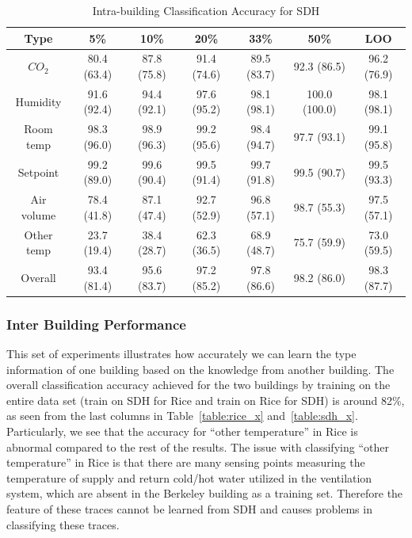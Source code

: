 \begin{table}[ht!]
\centering %
\begin{tabular}{c | c | c | c | c | c | c}%
\hline %
Type & 5\% & 10\% & 20\% & 33\% & 50\% & LOO\\ %
\hline\hline %
$CO_{2}$ & 80.4 (63.4) & 87.8 (75.8) & 91.4 (74.6) & 89.5 (83.7) & 92.3 (86.5) & 96.2 (76.9)\\ \hline
Humidity & 91.6 (92.4) & 94.4 (92.1) & 97.6 (95.2) & 98.1 (98.1) & 100.0 (100.0) & 98.1 (98.1)\\ \hline
Room temp & 98.3 (96.0) & 98.9 (96.3) & 99.2 (95.6) & 98.4 (94.7) & 97.7 (93.1) & 99.1 (95.8)\\ \hline
Setpoint & 99.2 (89.0) & 99.6 (90.4) & 99.5 (91.4) & 99.7 (91.8) & 99.5 (90.7) & 99.5 (93.3)\\ \hline
Air volume & 78.4 (41.8) & 87.1 (47.4) & 92.7 (52.9) & 96.8 (57.1) & 98.7 (55.3) & 97.5 (57.1)\\ \hline
Other temp & 23.7 (19.4) & 38.4 (28.7) & 62.3 (36.5) & 68.9 (48.7) & 75.7 (59.9) & 73.0 (59.5)\\ \hline
Overall & 93.4 (81.4) & 95.6 (83.7) & 97.2 (85.2) & 97.8 (86.6) & 98.2 (86.0) & 98.3 (87.7)\\ \hline
\end{tabular}
\caption{Intra-building Classification Accuracy for SDH}
\label{table:sdh} %
\end{table}

\subsubsection{Inter Building Performance}
This set of experiments illustrates how accurately we can learn the type information of one building based on the knowledge from another building. The overall classification accuracy 
achieved for the two buildings by training on the entire data set (train on SDH for Rice and train on Rice for SDH) is around 82\%, as seen from the last columns in Table~\ref{table:rice_x} 
and~\ref{table:sdh_x}. Particularly, we see that the accuracy for ``other temperature'' in Rice is abnormal compared to the rest of the
results. The issue with classifying ``other temperature'' in Rice is that there are many sensing points measuring the temperature of supply and return cold/hot water utilized in the 
ventilation system, which are absent in the Berkeley building as a training set. Therefore the feature of these traces cannot be learned from SDH and causes problems in classifying these traces.

